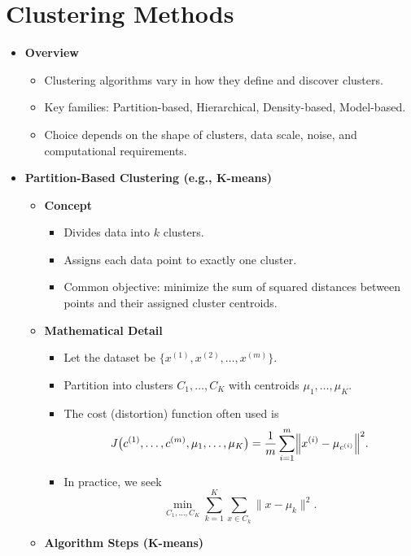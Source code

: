 \documentclass[10pt]{article}
\begin{document}
\section{Clustering Methods}
\begin{itemize}
    \item \textbf{Overview}
    \begin{itemize}
        \item Clustering algorithms vary in how they define and discover clusters.
        \item Key families: Partition-based, Hierarchical, Density-based, Model-based.
        \item Choice depends on the shape of clusters, data scale, noise, and computational requirements.
    \end{itemize}
    \item \textbf{Partition-Based Clustering (e.g., K-means)}
    \begin{itemize}
        \item \textbf{Concept}
        \begin{itemize}
            \item Divides data into $k$ clusters.
            \item Assigns each data point to exactly one cluster.
            \item Common objective: minimize the sum of squared distances between points and their assigned cluster centroids.
        \end{itemize}
        \item \textbf{Mathematical Detail}
        \begin{itemize}
            \item Let the dataset be $\{x^{(1)}, x^{(2)}, \ldots, x^{(m)}\}$.
            \item Partition into clusters $C_1, \ldots, C_K$ with centroids $\mu_1, \ldots, \mu_K$.
            \item The cost (distortion) function often used is
            \[
            J\bigl(c^{(1)}, \ldots, c^{(m)}, \mu_{1}, \ldots, \mu_{K}\bigr)=\frac{1}{m} \sum_{i=1}^{m}\Bigl\|x^{(i)}-\mu_{c^{(i)}}\Bigr\|^{2}.
            \]
            \item In practice, we seek
            \[
            \min_{C_1, \ldots, C_K} \sum_{k=1}^{K} \sum_{x \in C_k} \| x - \mu_k \|^2.
            \]
        \end{itemize}
        \item \textbf{Algorithm Steps (K-means)}
        \begin{itemize}

\end{itemize}
\end{itemize}
\end{itemize}
\end{document}
